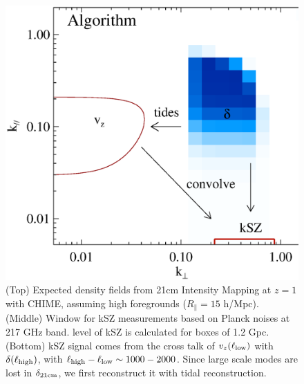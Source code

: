\begin{figure}[tbp]
\begin{minipage}[t]{\linewidth}
\includegraphics[width=\textwidth]{figure/demo_convolution.eps}
\vspace{-0.6cm}
\end{minipage}
\caption{
    (Top) Expected density fields from    
    21cm Intensity Mapping at $z=1$ with  
    CHIME, assuming high foregrounds ($R_\parallel=15$ h/Mpc). 
    (Middle) Window for kSZ measurements based on Planck noises at 217 GHz band. level of kSZ is calculated for boxes of 1.2 Gpc.
    (Bottom) %
    kSZ signal comes from the cross talk of 
    $v_z(\ell_\mathrm{low})$ with $\delta(\ell_\mathrm{high})$, 
    with $\ell_\mathrm{high}-\ell_\mathrm{low}\sim1000-2000$. 
    Since large scale modes are lost in $\delta_\mathrm{21cm}$, 
    we first reconstruct it with tidal reconstruction. 
}
\end{figure}

